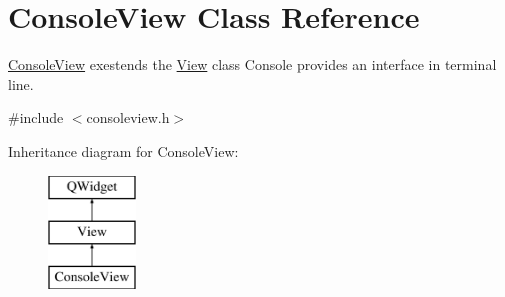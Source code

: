 \hypertarget{class_console_view}{}\section{Console\+View Class Reference}
\label{class_console_view}


\hyperlink{class_console_view}{Console\+View} exestends the \hyperlink{class_view}{View} class Console provides an interface in terminal line.  




{\ttfamily \#include $<$consoleview.\+h$>$}

Inheritance diagram for Console\+View\+:\begin{figure}[H]
\begin{center}
\leavevmode
\includegraphics[height=3.000000cm]{class_console_view}
\end{center}
\end{figure}
